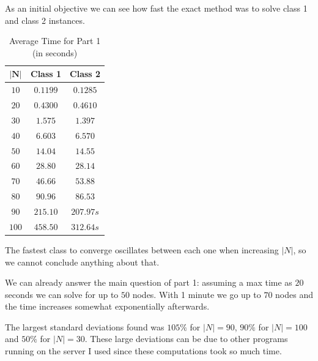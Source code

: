 \documentclass[a4paper,12pt]{article}
\begin{document}
		
		As an initial objective we can see how fast the exact method was to solve class 1 and class 2 instances.
		\begin{table}[H]
			\centering
			\begin{tabular}{c|c|c}
				$\mathbf{|N|}$  & \textbf{Class 1} 	& \textbf{Class 2}  \\ \hline
				$ 10  $			& $ 0.1199 $ 		& $ 0.1285 $ 		\\ \hline
				$ 20  $			& $ 0.4300  $ 		& $ 0.4610 $		\\ \hline
				$ 30  $			& $ 1.575  $	 	& $ 1.397 $ 		\\ \hline
				$ 40  $			& $ 6.603  $ 		& $ 6.570 $ 		\\ \hline
				$ 50  $			& $ 14.04  $ 		& $ 14.55 $ 		\\ \hline
				$ 60 $			& $ 28.80  $ 		& $ 28.14 $ 		\\ \hline
				$ 70 $			& $ 46.66 $	 		& $ 53.88 $ 		\\ \hline
				$ 80 $			& $ 90.96 $ 		& $ 86.53 $ 		\\ \hline
				$ 90 $			& $ 215.10 $	 	& $ 207.97 s $ 		\\ \hline
				$ 100 $			& $ 458.50 $ 		& $ 312.64 s $ 		\\ 
			\end{tabular}
			\caption{Average Time for Part 1 (in seconds)}
			\label{table:times}
		\end{table}
		The fastest class to converge oscillates between each one when increasing $ |N| $, so we cannot conclude anything about that.		
				
		We can already answer the main question of part 1: assuming a max time as $ 20 $ seconds we can solve for up to $ 50 $ nodes.
		With 1 minute we go up to $ 70 $ nodes and the time increases somewhat exponentially afterwards.
		
		The largest standard deviations found was $ 105\% $ for $ |N| = 90$, $ 90\% $ for $ |N| = 100$ and $ 50\% $ for $ |N| = 30$.
		These large deviations can be due to other programs running on the server I used since these computations took so much time.
		
\end{document}
